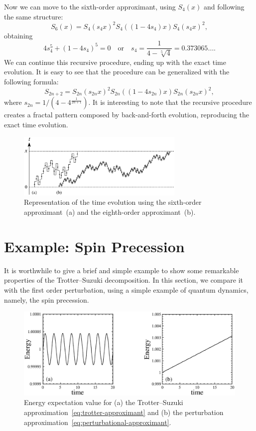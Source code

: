 Now we can move to the sixth-order approximant, using $S_4(x)$ and following the same structure:
\begin{equation} \label{eq:sixth-order}
S_6(x) = S_4(s_4x)^2 S_4((1-4s_4)x) S_4(s_4x)^2,
\end{equation}
obtaining
\begin{equation}
4s_4^5 + (1-4s_4)^5 = 0 \quad \mathrm{or} \quad s_4 = \frac{1}{4-\sqrt[5]{4}} = 0.373065\ldots .
\end{equation}
We can continue this recursive procedure, ending up with the exact time evolution. It is easy to see that the procedure can be generalized with the following formula:
\begin{equation}
S_{2n+2} = S_{2n}(s_{2n}x)^2 S_{2n}((1-4s_{2n})x) S_{2n}(s_{2n}x)^2,
\end{equation}
where $s_{2n} = 1/(4-4^{\frac{1}{2n+1}})$.
It is interesting to note that the recursive procedure creates a fractal pattern composed by back-and-forth evolution, reproducing the exact time evolution.
\begin{figure}
  \centering
   \includegraphics[width=8cm]{Plots/fractal_evolution.eps}
   \caption{Representation of the time evolution using the sixth-order approximant~(a) and the eighth-order approximant~(b).} \label{plot:fractal-evolution}
\end{figure}

\section{Example: Spin Precession}
It is worthwhile to give a brief and simple example to show some remarkable properties of the Trotter--Suzuki decomposition. In this section, we compare it with the first order perturbation, using a simple example of quantum dynamics, namely, the spin precession.

\begin{figure}[t]
  \centering
   \includegraphics[width=12cm]{Plots/spin_evolution.eps}
   \caption{Energy expectation value for (a) the Trotter--Suzuki approximation~\eqref{eq:trotter-approximant} and (b) the perturbation approximation~\eqref{eq:perturbational-approximant}.} \label{plot:spin-evolution}
\end{figure}

